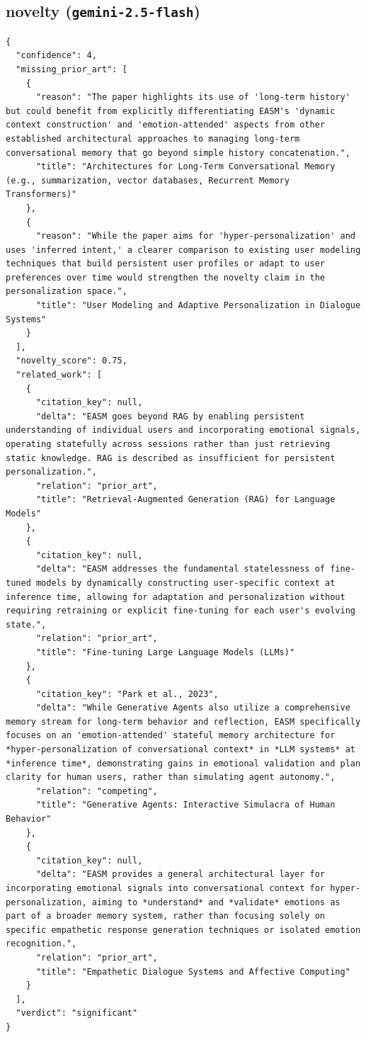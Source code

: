 \documentclass[11pt]{article}
\begin{document}
\subsection*{novelty (\texttt{gemini-2.5-flash})}
\begin{verbatim}
{
  "confidence": 4,
  "missing_prior_art": [
    {
      "reason": "The paper highlights its use of 'long-term history' but could benefit from explicitly differentiating EASM's 'dynamic context construction' and 'emotion-attended' aspects from other established architectural approaches to managing long-term conversational memory that go beyond simple history concatenation.",
      "title": "Architectures for Long-Term Conversational Memory (e.g., summarization, vector databases, Recurrent Memory Transformers)"
    },
    {
      "reason": "While the paper aims for 'hyper-personalization' and uses 'inferred intent,' a clearer comparison to existing user modeling techniques that build persistent user profiles or adapt to user preferences over time would strengthen the novelty claim in the personalization space.",
      "title": "User Modeling and Adaptive Personalization in Dialogue Systems"
    }
  ],
  "novelty_score": 0.75,
  "related_work": [
    {
      "citation_key": null,
      "delta": "EASM goes beyond RAG by enabling persistent understanding of individual users and incorporating emotional signals, operating statefully across sessions rather than just retrieving static knowledge. RAG is described as insufficient for persistent personalization.",
      "relation": "prior_art",
      "title": "Retrieval-Augmented Generation (RAG) for Language Models"
    },
    {
      "citation_key": null,
      "delta": "EASM addresses the fundamental statelessness of fine-tuned models by dynamically constructing user-specific context at inference time, allowing for adaptation and personalization without requiring retraining or explicit fine-tuning for each user's evolving state.",
      "relation": "prior_art",
      "title": "Fine-tuning Large Language Models (LLMs)"
    },
    {
      "citation_key": "Park et al., 2023",
      "delta": "While Generative Agents also utilize a comprehensive memory stream for long-term behavior and reflection, EASM specifically focuses on an 'emotion-attended' stateful memory architecture for *hyper-personalization of conversational context* in *LLM systems* at *inference time*, demonstrating gains in emotional validation and plan clarity for human users, rather than simulating agent autonomy.",
      "relation": "competing",
      "title": "Generative Agents: Interactive Simulacra of Human Behavior"
    },
    {
      "citation_key": null,
      "delta": "EASM provides a general architectural layer for incorporating emotional signals into conversational context for hyper-personalization, aiming to *understand* and *validate* emotions as part of a broader memory system, rather than focusing solely on specific empathetic response generation techniques or isolated emotion recognition.",
      "relation": "prior_art",
      "title": "Empathetic Dialogue Systems and Affective Computing"
    }
  ],
  "verdict": "significant"
}
\end{verbatim}
\end{document}
